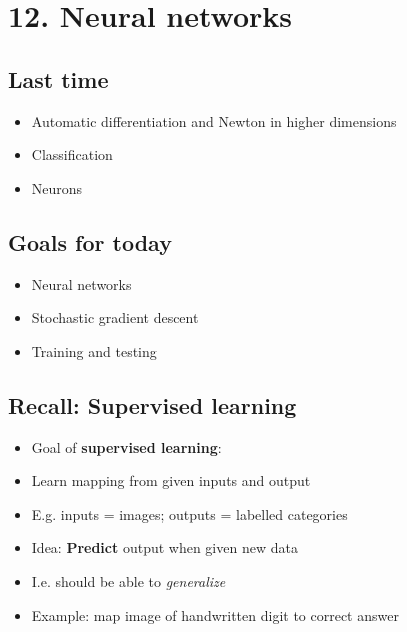 \hypertarget{neural-networks}{%
\section{12. Neural networks}\label{neural-networks}}

\hypertarget{last-time}{%
\subsection{Last time}\label{last-time}}

\begin{itemize}
\item
  Automatic differentiation and Newton in higher dimensions
\item
  Classification
\item
  Neurons
\end{itemize}

\hypertarget{goals-for-today}{%
\subsection{Goals for today}\label{goals-for-today}}

\begin{itemize}
\item
  Neural networks
\item
  Stochastic gradient descent
\item
  Training and testing
\end{itemize}

\hypertarget{recall-supervised-learning}{%
\subsection{Recall: Supervised
learning}\label{recall-supervised-learning}}

\begin{itemize}
\item
  Goal of \textbf{supervised learning}:
\item
  Learn mapping from given inputs and output
\item
  E.g. inputs = images; outputs = labelled categories
\item
  Idea: \textbf{Predict} output when given new data
\item
  I.e. should be able to \emph{generalize}
\item
  Example: map image of handwritten digit to correct answer
\end{itemize}

